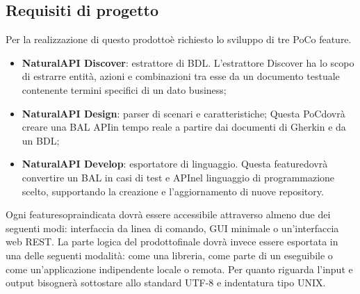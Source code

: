 \subsection{Requisiti di progetto}
Per la realizzazione di questo prodotto\glosp è richiesto lo sviluppo di tre PoC\glosp o feature\glo.
\begin{itemize}
	\item \textbf{NaturalAPI Discover}: estrattore di BDL.
	L'estrattore Discover ha lo scopo di estrarre entità, azioni e combinazioni tra esse da un documento testuale contenente termini specifici di un dato business;
	\item \textbf{NaturalAPI Design}: parser di scenari e caratteristiche;
	Questa PoC\glosp dovrà creare una BAL API\glosp in tempo reale a partire dai documenti di Gherkin e da un BDL;
	\item \textbf{NaturalAPI Develop}: esportatore di linguaggio.
	Questa feature\glosp dovrà convertire un BAL in casi di test e API\glosp nel linguaggio di programmazione scelto, supportando la creazione e l'aggiornamento di nuove repository\glo.
\end{itemize}
Ogni feature\glosp sopraindicata dovrà essere accessibile attraverso almeno due dei seguenti modi: interfaccia da linea di comando, GUI minimale o un'interfaccia web REST\glo. La parte logica del prodotto\glosp finale dovrà invece essere esportata in una delle seguenti modalità: come una libreria, come parte di un eseguibile o come un'applicazione indipendente locale o remota. 
Per quanto riguarda l'input e output bisognerà sottostare allo standard UTF-8 e indentatura tipo UNIX. 

